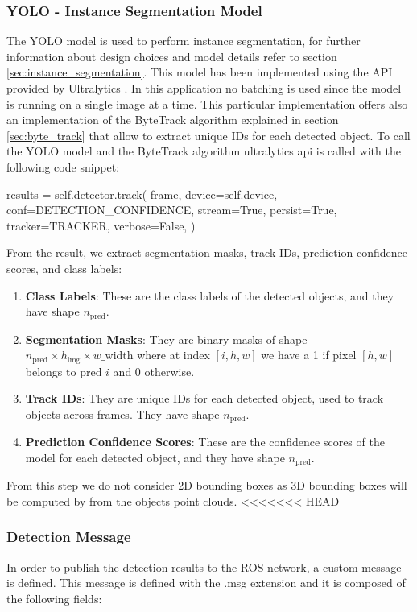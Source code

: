 \subsubsection[YOLO]{YOLO - Instance Segmentation Model}
The YOLO model is used to perform instance segmentation, for further information about 
design choices and model details refer to section \ref{sec:instance_segmentation}.
This model has been implemented using the API provided by Ultralytics \cite{ultralytics_yolo_2023}.
In this application no batching is used since the model is running on a single image at a time.
This particular implementation offers also an implementation of the ByteTrack algorithm explained in section 
\ref{sec:byte_track} that allow to extract unique IDs for each detected object.
To call the YOLO model and the ByteTrack algorithm ultralytics api is called with the following code snippet:
\begin{python}
results = self.detector.track(
                frame,
                device=self.device,
                conf=DETECTION_CONFIDENCE,
                stream=True,
                persist=True,
                tracker=TRACKER,
                verbose=False,
            )
\end{python}
From the result, we extract segmentation masks, track IDs, prediction confidence scores, and class labels:
\begin{enumerate}
    \item \textbf{Class Labels}: These are the class labels of the detected objects, and they have shape \( n_{\text{pred}} \).
    \item \textbf{Segmentation Masks}: They are binary masks of shape \( n_{\text{pred}} \times h_{\text{img}} \times w\_{\text{width}} \) where at index \( [i, h, w] \) we have a 1 if pixel \( [h, w] \) belongs to pred \( i \) and 0 otherwise.
    \item \textbf{Track IDs}: They are unique IDs for each detected object, used to track objects across frames. They have shape \( n_{\text{pred}} \).
    \item \textbf{Prediction Confidence Scores}: These are the confidence scores of the model for each detected object, and they have shape \( n_{\text{pred}} \).
\end{enumerate}
From this step we do not consider 2D bounding boxes as 3D bounding boxes will be computed by from the objects point clouds.
<<<<<<< HEAD

\subsubsection[Detection Message]{Detection Message}
In order to publish the detection results to the ROS network, a custom message is defined.
This message is defined with the .msg extension and it is composed of the following fields:

